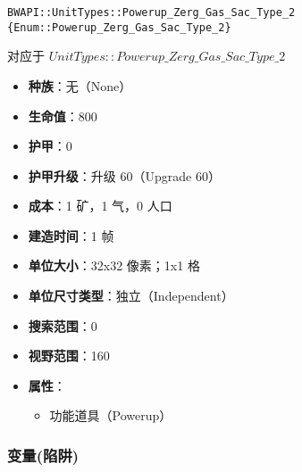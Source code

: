 \begin{tcolorbox}[colback=white, colframe=black!60!white, title=Powerup\_Zerg\_Gas\_Sac\_Type\_2(), arc=0mm]
    \begin{verbatim}
BWAPI::UnitTypes::Powerup_Zerg_Gas_Sac_Type_2 {Enum::Powerup_Zerg_Gas_Sac_Type_2}
    \end{verbatim}
    对应于  $UnitTypes::Powerup\_Zerg\_Gas\_Sac\_Type\_2$ 
    \begin{itemize}
        \item \textbf{种族}：无（None）
        \item \textbf{生命值}：800
        \item \textbf{护甲}：0
        \item \textbf{护甲升级}：升级 60（Upgrade 60）
        \item \textbf{成本}：1 矿，1 气，0 人口
        \item \textbf{建造时间}：1 帧
        \item \textbf{单位大小}：32x32 像素；1x1 格
        \item \textbf{单位尺寸类型}：独立（Independent）
        \item \textbf{搜索范围}：0
        \item \textbf{视野范围}：160
        \item \textbf{属性}：
            \begin{itemize}
                \item 功能道具（Powerup）
            \end{itemize}
    \end{itemize}
\end{tcolorbox}

\subsubsection{变量(陷阱)}

